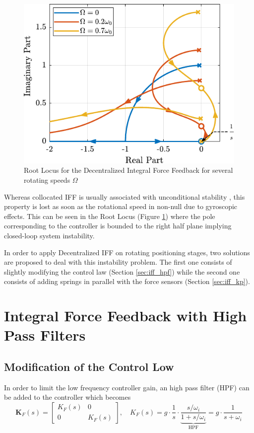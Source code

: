 \documentclass{ISMA_USD2020}
\begin{document}
\begin{figure}[htbp]
\centering
\includegraphics[scale=1]{figs/root_locus_pure_iff.pdf}
\caption{\label{fig:root_locus_pure_iff}Root Locus for the Decentralized Integral Force Feedback for several rotating speeds \(\Omega\)}
\end{figure}

Whereas collocated IFF is usually associated with unconditional stability \cite{preumont91_activ}, this property is lost as soon as the rotational speed in non-null due to gyroscopic effects.
This can be seen in the Root Locus (Figure \ref{fig:root_locus_pure_iff}) where the pole corresponding to the controller is bounded to the right half plane implying closed-loop system instability.

In order to apply Decentralized IFF on rotating positioning stages, two solutions are proposed to deal with this instability problem.
The first one consists of slightly modifying the control law (Section \ref{sec:iff_hpf}) while the second one consists of adding springs in parallel with the force sensors (Section \ref{sec:iff_kp}).

\section{Integral Force Feedback with High Pass Filters}
\label{sec:org58cf10c}
\label{sec:iff_hpf}
\subsection{Modification of the Control Low}
\label{sec:org24c412f}
In order to limit the low frequency controller gain, an high pass filter (HPF) can be added to the controller which becomes
\begin{equation}
\label{eq:IFF_LHF}
  \bm{K}_F(s) = \begin{bmatrix} K_F(s) & 0 \\ 0 & K_F(s) \end{bmatrix}, \quad K_{F}(s) = g \cdot \frac{1}{s} \cdot \underbrace{\frac{s/\omega_i}{1 + s/\omega_i}}_{\text{HPF}} = g \cdot \frac{1}{s + \omega_i}
\end{equation}
\end{document}
